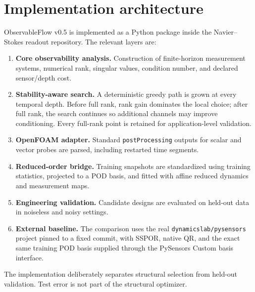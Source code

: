 \documentclass[11pt]{article}
\begin{document}
\section{Implementation architecture}
ObservableFlow v0.5 is implemented as a Python package inside the Navier--Stokes readout repository. The relevant layers are:
\begin{enumerate}
\item \textbf{Core observability analysis.} Construction of finite-horizon measurement systems, numerical rank, singular values, condition number, and declared sensor/depth cost.
\item \textbf{Stability-aware search.} A deterministic greedy path is grown at every temporal depth. Before full rank, rank gain dominates the local choice; after full rank, the search continues so additional channels may improve conditioning. Every full-rank point is retained for application-level validation.
\item \textbf{OpenFOAM adapter.} Standard \texttt{postProcessing} outputs for scalar and vector probes are parsed, including restarted time segments.
\item \textbf{Reduced-order bridge.} Training snapshots are standardized using training statistics, projected to a POD basis, and fitted with affine reduced dynamics and measurement maps.
\item \textbf{Engineering validation.} Candidate designs are evaluated on held-out data in noiseless and noisy settings.
\item \textbf{External baseline.} The comparison uses the real \texttt{dynamicslab/pysensors} project pinned to a fixed commit, with SSPOR, native QR, and the exact same training POD basis supplied through the PySensors Custom basis interface.
\end{enumerate}
The implementation deliberately separates structural selection from held-out validation. Test error is not part of the structural optimizer.
\end{document}
